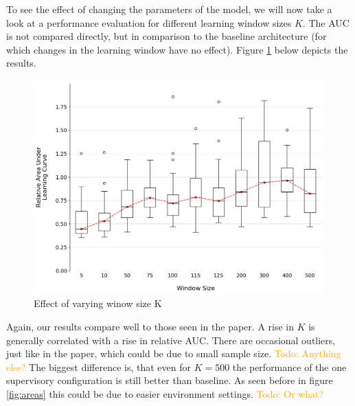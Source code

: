 \documentclass[letterpaper]{article}
\newcommand\todo[1]{\textcolor{orange}{Todo: #1}}
\begin{document}
To see the effect of changing the parameters of the model, we will now take a look at a performance evaluation for different learning window sizes $K$. The AUC is not compared directly, but in comparison to the baseline architecture (for which changes in the learning window have no effect). Figure \ref{fig:windows} below depicts the results.
\begin{figure}[ht]
 \begin{center}
  \includegraphics[width=\linewidth]{figures/figure4_extended}
  \caption{Effect of varying winow size K}
  \label{fig:windows}
 \end{center}
\end{figure}

Again, our results compare well to those seen in the paper. A rise in $K$ is generally correlated with a rise in relative AUC. There are occasional outliers, just like in the paper, which could be due to small sample size. \todo{Anything else?} The biggest difference is, that even for $K=500$ the performance of the one supervisory configuration is still better than baseline. As seen before in figure \ref{fig:areas} this could be due to easier environment settings. \todo{Or what?}
\end{document}
